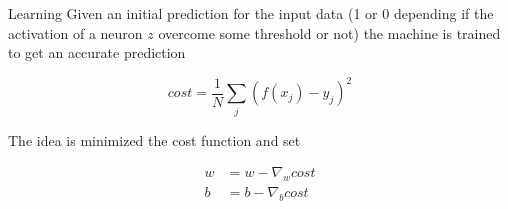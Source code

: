 \documentclass[mathserif]{beamer}
\begin{document}
\begin{frame}{Learning}
\small Given an initial prediction for the input data (1 or 0 depending if the activation of a neuron $z$ overcome some threshold or not) the machine is trained to get an accurate prediction

\begin{equation*}
cost=\frac{1}{N}\sum_{j}{(f(x_{j})-y_{j})^{2}}
\end{equation*}

The idea is minimized the cost function and set

\begin{align*}
w&=w-\nabla_{w}cost\\
b&=b-\nabla_{b}cost
\end{align*}
\end{frame}
\end{document}
